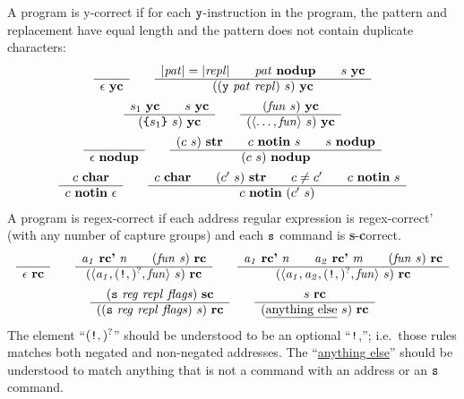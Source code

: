 \documentclass[11pt]{article}
\newcommand\RULE[3][]{\begin{array}{c} #2 \\ \hline #3 \end{array}}
\newcommand\J[1]{\ensuremath{\textbf{#1}}}
\newcommand\cmd[1]{\ensuremath{\text{\texttt{#1}}}}
\renewcommand\arg[1]{\ensuremath{\mathit{#1}}}
\newcommand\angles[1]{\langle #1 \rangle}
\begin{document}
A program is y-correct if for each \cmd{y}-instruction in the program, the pattern and replacement have equal length and the pattern does not contain duplicate characters:
\begin{gather*}
	\RULE{}{\epsilon\ \J{yc}} \qquad
	\RULE{|\arg{pat}| = |\arg{repl}| \qquad \arg{pat}\ \J{nodup} \qquad s\ \J{yc}}{((\cmd{y}\ \arg{pat}\ \arg{repl})\ s)\ \J{yc}} \\
%
	\RULE{s_1\ \J{yc} \qquad s\ \J{yc}}{(\cmd{\{} s_1 \cmd{\}}\ s)\ \J{yc}} \qquad
	\RULE{(\arg{fun}\ s)\ \J{yc}}{(\angles{\ldots, \arg{fun}}\ s)\ \J{yc}} \\
	\RULE{}{\epsilon\ \J{nodup}} \qquad
	\RULE{(c\ s)\ \J{str} \qquad c\ \J{notin}\ s \qquad s\ \J{nodup}}{(c\ s)\ \J{nodup}} \\
	\RULE{c\ \J{char}}{c\ \J{notin}\ \epsilon} \qquad
	\RULE{c\ \J{char} \qquad (c'\ s)\ \J{str} \qquad c \not= c' \qquad c\ \J{notin}\ s}{c\ \J{notin}\ (c'\ s)}
\end{gather*}
%
A program is regex-correct if each address regular expression is regex-correct' (with any number of capture groups) and each \cmd{s} command is \textbf{s}-\textbf{c}orrect.
\begin{gather*}
	\RULE{}{\epsilon\ \J{rc}} \qquad
	\RULE{\arg{a_1}\ \J{rc'}\ \arg{n} \qquad (\arg{fun}\ \arg{s})\ \J{rc}}{(\angles{\arg{a_1}, (\cmd{!},)^?, \arg{fun}}\ s)\ \J{rc}} \qquad
	\RULE{\arg{a_1}\ \J{rc'}\ \arg{n} \qquad \arg{a_2}\ \J{rc'}\ \arg{m} \qquad (\arg{fun}\ s)\ \J{rc}}{(\angles{\arg{a_1}, \arg{a_2}, (\cmd{!},)^?, \arg{fun}}\ s)\ \J{rc}} \\
	\RULE{(\cmd{s}\ \arg{reg}\ \arg{repl}\ \arg{flags})\ \J{sc}}{((\cmd{s}\ \arg{reg}\ \arg{repl}\ \arg{flags})\ \arg{s})\ \J{rc}} \qquad
	\RULE{s\ \J{rc}}{(\text{\underline{anything else}}\ s)\ \J{rc}}
\end{gather*}
The element ``$(\cmd{!},)^?$'' should be understood to be an optional ``\cmd{!},''; i.e.\ those rules matches both negated and non-negated addresses.
The ``\underline{anything else}'' should be understood to match anything that is not a command with an address or an \cmd{s} command.
\end{document}
